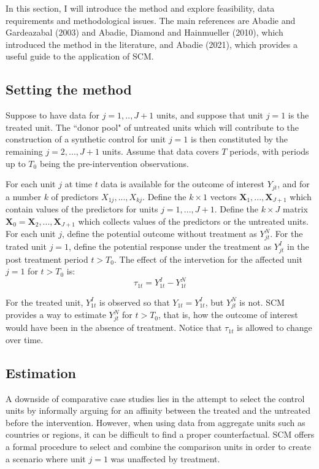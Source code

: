\documentclass[12pt,a4paper,draft]{article}
\begin{document}
In this section, I will introduce the method and explore feasibility, 
data requirements and methodological issues. 
The main references are Abadie and Gardeazabal (2003) and Abadie, Diamond and 
Hainmueller (2010), which introduced the method in the literature, and Abadie 
(2021), which provides a useful guide to the application of SCM.

\subsection{Setting the method}
Suppose to have data for $j=1,..,J+1$ units, and suppose that unit $j=1$ is the 
treated unit. The ``donor pool" of untreated units which will contribute to the 
construction of a synthetic control for unit $j=1$ is then constituted by the 
remaining $j=2,...,J+1$ units.
Assume that data covers $T$ periods, with periods up to $T_0$ being the 
pre-intervention observations.

For each unit $j$ at time $t$ data is available for the outcome of interest 
$Y_{jt}$, and for a number $k$ of predictors $X_{1j}, ..., X_{kj}$. Define the 
$k \times 1$ vectors $\mathbf{X}_1, ..., \mathbf{X}_{J+1}$ which contain values
of the predictors for units $j=1,...,J+1$. Define the $k \times J$ matrix 
$\mathbf{X}_0={\mathbf{X}_2,..., \mathbf{X}_{J+1}}$ which collects values of the predictors 
or the untreated units.
For each unit $j$, define the potential outcome without treatment as $Y_{jt}^N$.
For the trated unit $j=1$, define the potential response under the treatment as 
$Y_{jt}^I$ in the post treatment period $t>T_0$. The effect of the intervetion 
for the affected unit $j=1$ for $t>T_0$ is: 
\begin{equation}
\tau_{1t}=Y_{1t}^I-Y_{1t}^N
\end{equation}

For the treated unit, $Y_{1t}^I$ is observed so that  $Y_{1t}=Y_{1t}^I$, but $Y_{jt}^N$ is not. 
SCM provides a way to estimate $Y_{jt}^N$ for $t>T_0$, that is, how the outcome 
of interest would have been in the absence of treatment. Notice that $\tau_{1t}$
is allowed to change over time.

\subsection{Estimation}
A downside of comparative case studies lies in the attempt to select the control 
units by informally arguing for an affinity between the treated and the untreated 
before the intervention. However, when using data from aggregate units such as 
countries or regions, it can be difficult to find a proper counterfactual.
SCM offers a formal procedure to select and combine the comparison units in order
to create a scenario where unit $j=1$ was unaffected by treatment.
\end{document}

